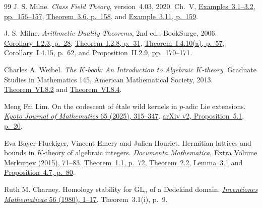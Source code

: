 \begin{thebibliography}{99}
J. S. Milne.
\emph{Class Field Theory}, version~4.03, 2020.
Ch.~V, \href{https://www.jmilne.org/math/CourseNotes/CFT.pdf\#page=165}
{Examples~3.1--3.2, pp.~156--157},
\href{https://www.jmilne.org/math/CourseNotes/CFT.pdf\#page=167}
{Theorem~3.6, p.~158}, and
\href{https://www.jmilne.org/math/CourseNotes/CFT.pdf\#page=168}
{Example~3.11, p.~159}.

J. S. Milne.
\emph{Arithmetic Duality Theorems}, 2nd ed., BookSurge, 2006.
\href{https://jmilne.org/math/Books/ADTnot.pdf\#page=36}
{Corollary~I.2.3, p.~28},
\href{https://jmilne.org/math/Books/ADTnot.pdf\#page=39}
{Theorem~I.2.8, p.~31},
\href{https://jmilne.org/math/Books/ADTnot.pdf\#page=65}
{Theorem~I.4.10(a), p.~57},
\href{https://jmilne.org/math/Books/ADTnot.pdf\#page=70}
{Corollary~I.4.15, p.~62}, and
\href{https://jmilne.org/math/Books/ADTnot.pdf\#page=178}
{Proposition~II.2.9, pp.~170--171}.

Charles A. Weibel.
\emph{The \(K\)-book: An Introduction to Algebraic \(K\)-theory}.
Graduate Studies in Mathematics 145, American Mathematical Society, 2013.
\href{https://sites.math.rutgers.edu/~weibel/Kbook/Kbook.VI.pdf\#page=47}
{Theorem~VI.8.2} and
\href{https://sites.math.rutgers.edu/~weibel/Kbook/Kbook.VI.pdf\#page=48}
{Theorem~VI.8.4}.

Meng Fai Lim.
On the codescent of \'etale wild kernels in \(p\)-adic Lie extensions.
\href{https://doi.org/10.1215/21562261-2024-0016}
{\emph{Kyoto Journal of Mathematics} 65 (2025), 315--347}.
\href{https://arxiv.org/pdf/2101.06695v2\#page=20}
{arXiv v2, Proposition~5.1, p.~20}.

Eva Bayer-Fluckiger, Vincent Emery and Julien Houriet.
Hermitian lattices and bounds in \(K\)-theory of algebraic integers.
\href{https://doi.org/10.4171/DMS/7/4}
{\emph{Documenta Mathematica}, Extra Volume Merkurjev (2015), 71--83}.
\href{https://ftp.gwdg.de/pub/misc/EMIS/journals/DMJDMV/vol-merkurjev/bayer_emery_houriet.pdf\#page=2}
{Theorem~1.1, p.~72},
\href{https://ftp.gwdg.de/pub/misc/EMIS/journals/DMJDMV/vol-merkurjev/bayer_emery_houriet.pdf\#page=4}
{Theorem~2.2},
\href{https://ftp.gwdg.de/pub/misc/EMIS/journals/DMJDMV/vol-merkurjev/bayer_emery_houriet.pdf\#page=5}
{Lemma~3.1} and
\href{https://ftp.gwdg.de/pub/misc/EMIS/journals/DMJDMV/vol-merkurjev/bayer_emery_houriet.pdf\#page=10}
{Proposition~4.7, p.~80}.

Ruth M. Charney.
Homology stability for \(\mathrm{GL}_n\) of a Dedekind domain.
\href{https://doi.org/10.1007/BF01403153}
{\emph{Inventiones Mathematicae} 56 (1980), 1--17}.
Theorem~3.1(i), p.~9.


\end{thebibliography}
